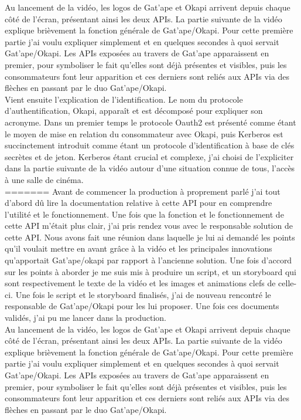 Au lancement de la vidéo, les logos de Gat'ape et Okapi arrivent depuis chaque côté de l'écran, présentant ainsi les deux APIs. La partie suivante de la vidéo explique brièvement la fonction générale de Gat'ape/Okapi. Pour cette première partie j'ai voulu expliquer simplement et en quelques secondes à quoi servait Gat'ape/Okapi. Les APIs exposées au travers de Gat'ape apparaissent en premier, pour symboliser le fait qu'elles sont déjà présentes et visibles, puis les consommateurs font leur apparition et ces derniers sont reliés aux APIs via des flèches en passant par le duo Gat'ape/Okapi.\\

Vient ensuite l'explication de l'identification. Le nom du protocole d'authentification, Okapi, apparaît et est décomposé pour expliquer son acronyme. Dans un premier temps le protocole Oauth2 est présenté comme étant le moyen de mise en relation du consommateur avec Okapi,  puis Kerberos est succinctement introduit comme étant un protocole d'identification à base de clés secrètes et de jeton. Kerberos étant crucial et complexe, j'ai choisi de l'expliciter dans la partie suivante de la vidéo autour d'une situation connue de tous, l'accès à une salle de cinéma.\\
=======
Avant de commencer la production à proprement parlé j'ai tout d'abord dû lire la documentation relative à cette API pour en comprendre l'utilité et le fonctionnement. Une fois que la fonction et le fonctionnement de cette API m'était plus clair, j'ai pris rendez vous avec le responsable solution de cette API. Nous avons fait une réunion dans laquelle je lui ai demandé les points qu'il voulait mettre en avant grâce à la vidéo et les principales innovations qu'apportait Gat'ape/okapi par rapport à l'ancienne solution. Une fois d'accord sur les points à aborder je me suis mis à produire un script, et un storyboard qui sont respectivement le texte de la vidéo et les images et animations clefs de celle-ci. Une fois le script et le storyboard finalisés, j'ai de nouveau rencontré le responsable de Gat'ape/Okapi pour les lui proposer. Une fois ces documents validés, j'ai pu me lancer dans la production. \\

Au lancement de la vidéo, les logos de Gat'ape et Okapi arrivent depuis chaque côté de l'écran, présentant ainsi les deux APIs. La partie suivante de la vidéo explique brièvement la fonction générale de Gat'ape/Okapi. Pour cette première partie j'ai voulu expliquer simplement et en quelques secondes à quoi servait Gat'ape/Okapi. Les APIs exposées au travers de Gat'ape apparaissent en premier, pour symboliser le fait qu'elles sont déjà présentes et visibles, puis les consommateurs font leur apparition et ces derniers sont reliés aux APIs via des flèches en passant par le duo Gat'ape/Okapi.\\

